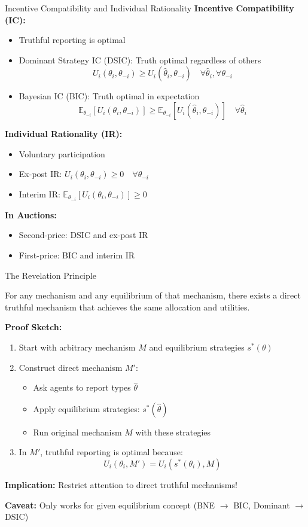 \documentclass[xcolor={x11names}, aspectratio=169 ]{beamer}
\newcommand{\E}{\mathbb{E}}
\begin{document}
\begin{frame}{Incentive Compatibility and Individual Rationality}
\textbf{Incentive Compatibility (IC):}
\begin{itemize}
  \item Truthful reporting is optimal
  \item Dominant Strategy IC (DSIC): Truth optimal regardless of others
  $$U_i(\theta_i, \theta_{-i}) \geq U_i(\hat{\theta}_i, \theta_{-i}) \quad \forall \hat{\theta}_i, \forall \theta_{-i}$$
  \item Bayesian IC (BIC): Truth optimal in expectation
  $$\E_{\theta_{-i}}[U_i(\theta_i, \theta_{-i})] \geq \E_{\theta_{-i}}[U_i(\hat{\theta}_i, \theta_{-i})] \quad \forall \hat{\theta}_i$$
\end{itemize}

\textbf{Individual Rationality (IR):}
\begin{itemize}
  \item Voluntary participation
  \item Ex-post IR: $U_i(\theta_i, \theta_{-i}) \geq 0 \quad \forall \theta_{-i}$
  \item Interim IR: $\E_{\theta_{-i}}[U_i(\theta_i, \theta_{-i})] \geq 0$
\end{itemize}

\textbf{In Auctions:}
\begin{itemize}
  \item Second-price: DSIC and ex-post IR
  \item First-price: BIC and interim IR
\end{itemize}
\end{frame}

\begin{frame}{The Revelation Principle}
\begin{theorem}
For any mechanism and any equilibrium of that mechanism, there exists a direct truthful mechanism that achieves the same allocation and utilities.
\end{theorem}

\textbf{Proof Sketch:}
\begin{enumerate}
  \item Start with arbitrary mechanism $M$ and equilibrium strategies $s^*(\theta)$
  \item Construct direct mechanism $M'$:
  \begin{itemize}
    \item Ask agents to report types $\hat{\theta}$
    \item Apply equilibrium strategies: $s^*(\hat{\theta})$
    \item Run original mechanism $M$ with these strategies
  \end{itemize}
  \item In $M'$, truthful reporting is optimal because:
  $$U_i(\theta_i, M') = U_i(s^*(\theta_i), M)$$
\end{enumerate}

\textbf{Implication:} Restrict attention to direct truthful mechanisms!

\textbf{Caveat:} Only works for given equilibrium concept (BNE $\rightarrow$ BIC, Dominant $\rightarrow$ DSIC)
\end{frame}
\end{document}
